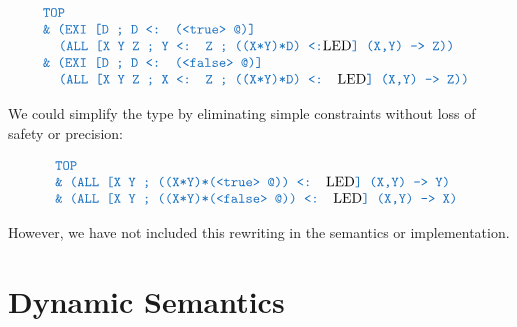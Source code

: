 \documentclass[acmsmall]{acmart}
\theoremstyle{definition}
\begin{document}
\[
  \begin{array}[t]{@{} l}
    \obj{TOP}
    \\
    \obj{\& (EXI [D ; D <: (<true> @)]}
    \\
    \I \obj{(ALL [X Y Z ; Y <: Z ; ((X*Y)*D) <:}\text{LED}\obj{] (X,Y) -> Z))}
    \\
    \obj{\& (EXI [D ; D <: (<false> @)]}
    \\
    \I \obj{(ALL [X Y Z ; X <: Z ; ((X*Y)*D) <: }\text{LED}\obj{] (X,Y) -> Z))}
  \end{array}
\]

We could simplify the type by eliminating simple constraints without loss of safety or precision:

\[
  \begin{array}[t]{@{} l}
    \obj{TOP}
    \\
    \obj{\& (ALL [X Y ; ((X*Y)*(<true> @)) <: }\text{LED}\obj{] (X,Y) -> Y)}
    \\
    \obj{\& (ALL [X Y ; ((X*Y)*(<false> @)) <: }\text{LED}\obj{] (X,Y) -> X)}
  \end{array}
\]

However, we have not included this rewriting in the semantics or implementation. 





\section{Dynamic Semantics}
\end{document}
